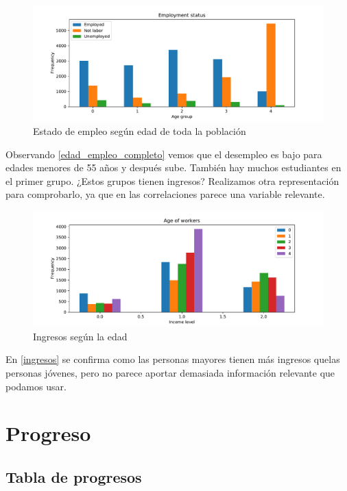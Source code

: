 \documentclass[twoside,openright,titlepage,numbers=noenddot,openany,headinclude,footinclude=true,
cleardoublepage=empty,abstractoff,BCOR=5mm,paper=a4,fontsize=12pt,main=spanish]{scrreprt}
\begin{document}
\begin{figure}[H]
\includegraphics[scale=0.5]{employment_status_segun_age.pdf}
\caption{Estado de empleo según edad de toda la población}
\label{edad_empleo_completo}
\end{figure}

Observando \eqref{edad_empleo_completo} vemos que el desempleo es bajo para edades menores de 55 años y después sube. También hay muchos estudiantes en el primer grupo. ¿Estos grupos tienen ingresos? Realizamos otra representación para comprobarlo, ya que en las correlaciones parece una variable relevante.

\begin{figure}[H]
\includegraphics[scale=0.5]{edad_segun_income.pdf}
\caption{Ingresos según la edad}
\label{ingresos}
\end{figure}

En \eqref{ingresos} se confirma como las personas mayores tienen más ingresos quelas personas jóvenes, pero no parece aportar demasiada información relevante que podamos usar.

\newpage
\section{Progreso}

\subsection{Tabla de progresos}
\end{document}
